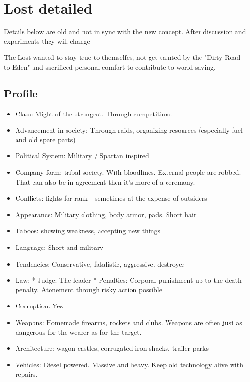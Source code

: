\chapter {Lost detailed}


\begin{warning}
    Details below are old and not in sync with the new concept. After discussion and experiments they will change
\end{warning}

The Lost wanted to stay true to themselfes, not get tainted by the "Dirty Road to Eden" and sacrificed personal comfort to contribute to world saving.

\section{Profile}
\begin{itemize}
    \item Class: Might of the strongest. Through competitions
    \item Advancement in society: Through raids, organizing resources (especially fuel and old spare parts)
    \item Political System: Military / Spartan inspired
    \item Company form: tribal society. With bloodlines. External people are robbed. That can also be in agreement then it's more of a ceremony.
    \item Conflicts: fights for rank - sometimes at the expense of outsiders
    \item Appearance: Military clothing, body armor, pads. Short hair
    \item Taboos: showing weakness, accepting new things
    \item Language: Short and military
    \item Tendencies: Conservative, fatalistic, aggressive, destroyer
    \item Law: * Judge: The leader * Penalties: Corporal punishment up to the death penalty. Atonement through risky action possible
    \item Corruption: Yes
    \item Weapons: Homemade firearms, rockets and clubs. Weapons are often just as dangerous for the wearer as for the target.
    \item Architecture: wagon castles, corrugated iron shacks, trailer parks
    \item Vehicles: Diesel powered. Massive and heavy. Keep old technology alive with repairs.

\end{itemize}
